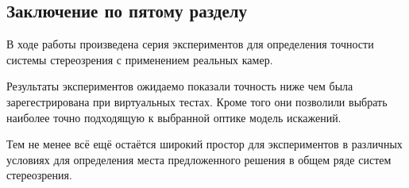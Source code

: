 \subsection{Заключение по пятому разделу}

В ходе работы произведена серия экспериментов для определения точности системы стереозрения с 
применением реальных камер. 

Результаты экспериментов ожидаемо показали точность ниже чем была зарегестрирована при виртуальных 
тестах. Кроме того они позволили выбрать наиболее точно подходящую к выбранной оптике модель 
искажений.

Тем не менее всё ещё остаётся широкий простор для экспериментов в различных условиях для 
определения места предложенного решения в общем ряде систем стереозрения. 
